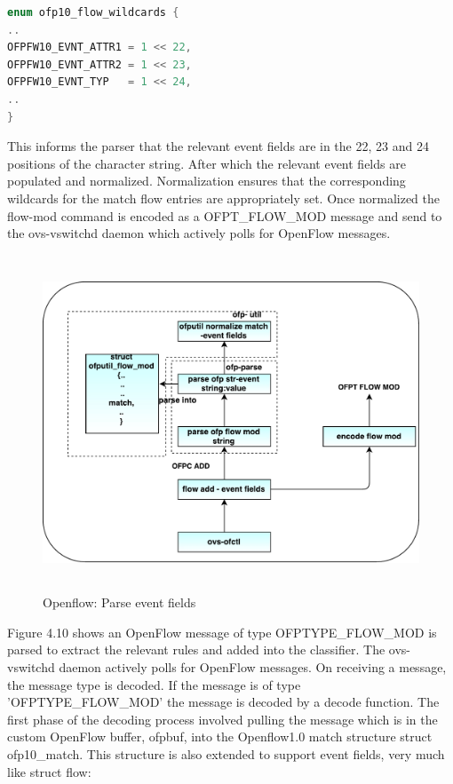 \begin{lstlisting}[language=c]
enum ofp10_flow_wildcards {
..
OFPFW10_EVNT_ATTR1 = 1 << 22,
OFPFW10_EVNT_ATTR2 = 1 << 23,
OFPFW10_EVNT_TYP   = 1 << 24,
..
}
\end{lstlisting}
This informs the parser that the relevant event fields are in the 22, 23 and 24 positions of the character string. After which the relevant event fields are populated and normalized. Normalization ensures that the corresponding wildcards for the match flow entries are appropriately set. Once normalized the flow-mod command is encoded as a OFPT_FLOW_MOD message and send to the ovs-vswitchd daemon which actively polls for OpenFlow messages.

\begin{figure}[H]
 \centering
 \caption{Openflow: Parse event fields}
 \includegraphics[height=10cm,width=14cm]{flowadd.pdf}
\end{figure}

Figure 4.10 shows an OpenFlow message of type OFPTYPE_FLOW_MOD is parsed to extract the relevant rules and added into the classifier. The ovs-vswitchd daemon actively polls for OpenFlow messages. On receiving a message, the message type is decoded. If the message is of type 'OFPTYPE_FLOW_MOD' the message is decoded by a decode function. The first phase of the decoding process involved pulling the message which is in the custom OpenFlow buffer, ofpbuf, into the Openflow1.0 match structure struct ofp10_match. This structure is also extended to support event fields, very much like struct flow: \newline

